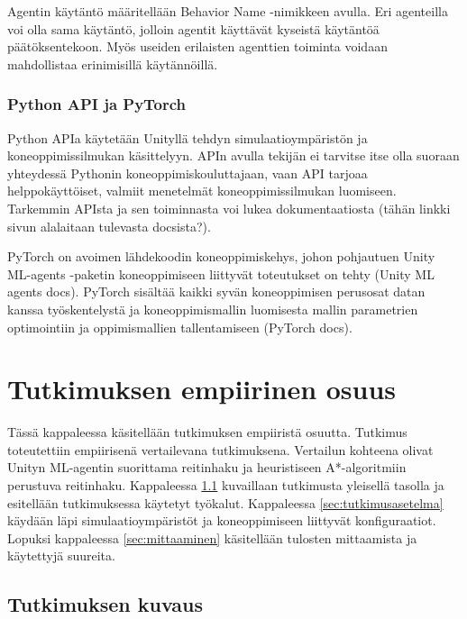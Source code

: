 \documentclass[utf8]{gradu3}
\begin{document}
Agentin käytäntö määritellään Behavior Name -nimikkeen avulla. Eri agenteilla voi olla sama käytäntö, jolloin agentit käyttävät kyseistä käytäntöä päätöksentekoon. Myös useiden erilaisten agenttien toiminta voidaan mahdollistaa erinimisillä käytännöillä.

\subsection{Python API ja PyTorch}

Python APIa käytetään Unityllä tehdyn simulaatioympäristön ja koneoppimissilmukan käsittelyyn. APIn avulla tekijän ei tarvitse itse olla suoraan yhteydessä Pythonin koneoppimiskouluttajaan, vaan API tarjoaa helppokäyttöiset, valmiit menetelmät koneoppimissilmukan luomiseen. Tarkemmin APIsta ja sen toiminnasta voi lukea dokumentaatiosta (tähän linkki sivun alalaitaan tulevasta docsista?).

PyTorch on avoimen lähdekoodin koneoppimiskehys, johon pohjautuen Unity ML-agents -paketin koneoppimiseen liittyvät toteutukset on tehty (Unity ML agents docs). PyTorch sisältää kaikki syvän koneoppimisen perusosat datan kanssa työskentelystä ja koneoppimismallin luomisesta mallin parametrien optimointiin ja oppimismallien tallentamiseen (PyTorch docs).

\chapter{Tutkimuksen empiirinen osuus}
\label{empiirinen}

Tässä kappaleessa käsitellään tutkimuksen empiiristä osuutta. Tutkimus toteutettiin empiirisenä vertailevana tutkimuksena. Vertailun kohteena olivat Unityn ML-agentin suorittama reitinhaku ja heuristiseen A*-algoritmiin perustuva reitinhaku. Kappaleessa \ref{sec:tutkimuksenkuvaus} kuvaillaan tutkimusta yleisellä tasolla ja esitellään tutkimuksessa käytetyt työkalut. Kappaleessa \ref{sec:tutkimusasetelma} käydään läpi simulaatioympäristöt ja koneoppimiseen liittyvät konfiguraatiot. Lopuksi kappaleessa \ref{sec:mittaaminen} käsitellään tulosten mittaamista ja käytettyjä suureita.

\section{Tutkimuksen kuvaus}
\label{sec:tutkimuksenkuvaus}
\end{document}
